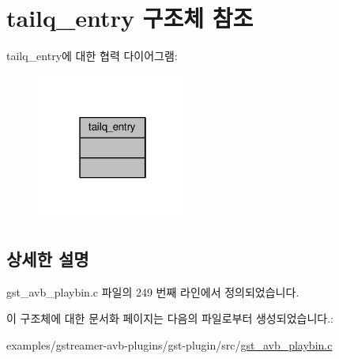 \hypertarget{structtailq__entry}{}\section{tailq\+\_\+entry 구조체 참조}
\label{structtailq__entry}


tailq\+\_\+entry에 대한 협력 다이어그램\+:
\nopagebreak
\begin{figure}[H]
\begin{center}
\leavevmode
\includegraphics[width=142pt]{structtailq__entry__coll__graph}
\end{center}
\end{figure}


\subsection{상세한 설명}


gst\+\_\+avb\+\_\+playbin.\+c 파일의 249 번째 라인에서 정의되었습니다.



이 구조체에 대한 문서화 페이지는 다음의 파일로부터 생성되었습니다.\+:\begin{DoxyCompactItemize}
\item 
examples/gstreamer-\/avb-\/plugins/gst-\/plugin/src/\hyperlink{gst__avb__playbin_8c}{gst\+\_\+avb\+\_\+playbin.\+c}\end{DoxyCompactItemize}
